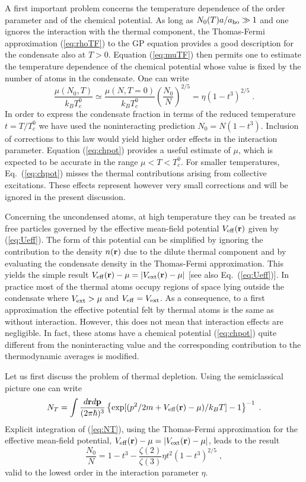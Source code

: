 A first important  problem concerns the  temperature dependence
of the order parameter and of the chemical potential. As long as
$N_0(T)a/a_{\rm ho} \gg 1$ and one ignores the interaction with the thermal
component, the Thomas-Fermi approximation (\ref{eq:rhoTF})
to the GP  equation provides  a good description for the condensate also at
$T>0$.  Equation (\ref{eq:muTF}) then permits one to estimate the temperature
dependence of the chemical potential whose value is fixed by the
number of atoms in the condensate. One can write
\begin{equation}
\frac{\mu(N_0,T)}{k_BT_c^0}\simeq\frac{\mu(N,T=0)}{k_BT_c^0}
\left(\frac{N_0}{N}\right)^{2/5}=\eta (1-t^3)^{2/5} \; .
\label{eq:chpot}
\end{equation}
In order to express the condensate fraction in terms of the reduced
temperature $t= T/T_c^0$ we have used the noninteracting  prediction
$N_0 = N(1-t^3)$. Inclusion of corrections to this law would yield
higher order effects in the interaction parameter. Equation 
(\ref{eq:chpot}) provides a  useful estimate of $\mu$, which is
expected to be accurate in the range $\mu<T<T_c^0$.
For smaller temperatures,  Eq.~(\ref{eq:chpot}) misses the
thermal contributions arising from collective excitations. These
effects represent however very small corrections and will be
ignored in the present discussion.

Concerning the uncondensed atoms, at high temperature 
they can be treated  as free particles governed by the effective 
mean-field potential $V_{\rm eff}({\bf r})$ given by (\ref{eq:Ueff}).
The form of this potential can be simplified by ignoring the
contribution  to the density $n({\bf r})$ due to the dilute thermal
component and by evaluating the condensate density
in the Thomas-Fermi approximation. This yields the simple result
$V_{\rm eff}({\bf r})-\mu=
|V_{\rm ext}({\bf r})-\mu|$ [see also Eq.~(\ref{eq:Ueff})]. 
In practice most of the thermal atoms occupy
regions of space lying outside the condensate where $V_{\rm ext}>\mu$ and
$V_{\rm eff}=V_{\rm ext}$.   As a consequence, to a first approximation
the effective potential felt by thermal atoms is the same as without
interaction. However, this does not mean that interaction effects are
negligible. In fact, these atoms have a chemical potential
(\ref{eq:chpot})  quite different from the noninteracting value
and the corresponding contribution to  the thermodynamic averages
is modified.

Let us first  discuss the problem of  thermal depletion. Using the
semiclassical picture one can write
\begin{equation}
N_T = \int \frac{d{\bf r} d{\bf p}}{(2\pi\hbar)^3}
\left\{ \exp[ (p^2/2m +
V_{\rm eff}({\bf r}) - \mu)/k_BT ] -1 \right\}^{-1} \;.
\label{eq:NT}
\end{equation}
Explicit integration of (\ref{eq:NT}), using the Thomas-Fermi 
approximation for the effective mean-field potential, 
$V_{\rm eff}({\bf r})-\mu=|V_{\rm ext}({\bf r})-\mu|$, 
leads to the result 
\begin{equation}
\frac{N_0}{N}
= 1 - t^3 - \frac{\zeta(2)}{\zeta(3)} \eta t^2 (1-t^3)^{2/5} \; ,
\label{eq:cdfr}
\end{equation}
valid to the lowest order in the interaction parameter $\eta$.

